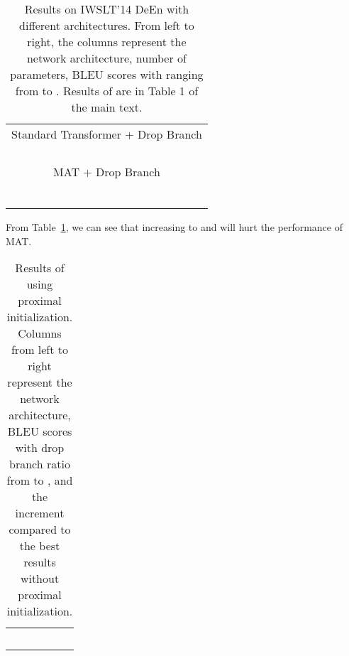 \documentclass{article}
\begin{document}
\begin{table}[!htbp]
\centering
\caption{Results on IWSLT'14 DeEn with different architectures. From left to right, the columns represent the network architecture, number of parameters, BLEU scores with  ranging from  to . Results of  are in Table 1 of the main text.}
\begin{tabular}{lcccc}
\toprule
 &   &  &  &  \\
\midrule
\multicolumn{5}{c}{Standard Transformer + Drop Branch} \\ 
\midrule
 &     &    &     &     \\
 &	 &	 &    &    \\
 &	 &	 &     &     \\
 & 	 &	 &    &     \\
\midrule
\multicolumn{5}{c}{MAT + Drop Branch} \\
\midrule
 &     &  &     &    \\
 &     &  &     &    \\
 &    &	 &    &    \\
 &     &	 &   &    \\
 & 	 &	 &    &    \\
 & 	 &	 &    &    \\
\bottomrule
\end{tabular}
\label{tab:iwslt_deen_multi-branch_attn-more}
\end{table}

From Table~\ref{tab:iwslt_deen_multi-branch_attn-more}, we can see that increasing  to  and  will hurt the performance of MAT.

\begin{table}[!htbp]
\centering
\caption{Results of using proximal initialization. Columns from left to right represent the network architecture, BLEU scores with drop branch ratio  from  to , and the increment compared to the best results without proximal initialization.}
\begin{tabular}{cccccc}
\toprule
&     &    &    &    &    \\
\midrule
 &   &  &  &  &  \\
 &   &	 &  &  &  \\
 &   &	 &  &  &  \\
 &   &	 &  &  &  \\
 &   &	 &  &  &  \\
\bottomrule
\end{tabular}
\label{tab:result_iwslt_deen-more}
\end{table}
\end{document}
